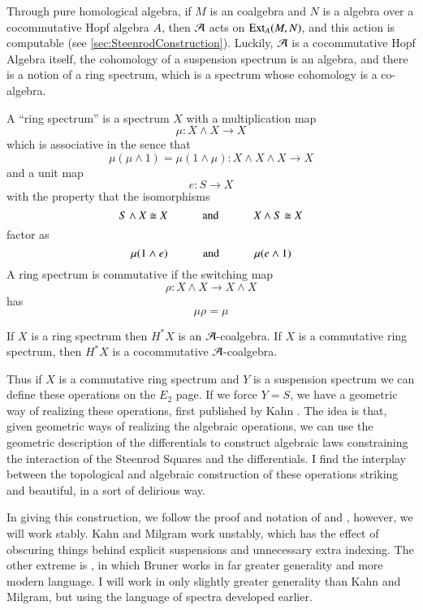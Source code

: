 Through pure homological algebra, if $M$ is an coalgebra and $N$ is a algebra over a cocommutative Hopf algebra $A$, then $\mathcal{A}$ acts on $\operatorname{Ext}\nolimits_A(M,N)$, and this action is computable (see \ref{sec:SteenrodConstruction}).  
Luckily, $\mathcal{A}$ is a cocommutative Hopf Algebra itself, the cohomology of a suspension spectrum is an algebra, and there is a notion of a ring spectrum, which is a spectrum whose cohomology is a co-algebra.
\begin{Def}
  A ``ring spectrum'' is a spectrum $X$ with a multiplication map
  \[\mu : X\wedge X \to X\]
  which is associative in the sence that
  \[\mu(\mu\wedge 1) =\mu(1\wedge \mu) : X\wedge X \wedge X \to X\]
  and a unit map
  \[e: S\to X\]
  with the property that the isomorphisms
  \[S\wedge X\cong X\hspace{10mm} \mbox{ and } \hspace{10mm} X\wedge S\cong X\]
  factor as
  \[\mu(1\wedge e)\hspace{10mm} \mbox{ and } \hspace{10mm} \mu(e\wedge 1)\]
  A ring spectrum is commutative if the switching map 
  \[\rho:X\wedge X\to X\wedge X\]
  has
  \[\mu\rho= \mu\]
\end{Def}
\begin{Lemma}
  If $X$ is a ring spectrum then $H^*X$ is an $\mathcal{A}$-coalgebra.
  If $X$ is a commutative ring spectrum, then $H^*X$ is a cocommutative $\mathcal{A}$-coalgebra.
\end{Lemma}
Thus if $X$ is a commutative ring spectrum and $Y$ is a suspension spectrum we can define these operations on the $E_2$ page.  
If we force $Y=S$, we have a geometric way of realizing these operations, first published by Kahn \cite{kahnCupi}.  
The idea is that, given geometric ways of realizing the algebraic operations, we can use the geometric description of the differentials to construct algebraic laws constraining the interaction of the Steenrod Squares and the differentials.  
I find the interplay between the topological and algebraic construction of these operations striking and beautiful, in a sort of delirious way.  


In giving this construction, we follow the proof and notation of \cite{kahnCupi} and \cite{milgramGroupReps}, however, we will work stably.  
Kahn and Milgram work unstably, which has the effect of obscuring things behind explicit suspensions and unnecessary extra indexing.  
The other extreme is \cite[Ch~IV.4]{H00RingSpectra}, in which Bruner works in far greater generality and more modern language.
I will work in only slightly greater generality than Kahn and Milgram, but using the language of spectra developed earlier.  

